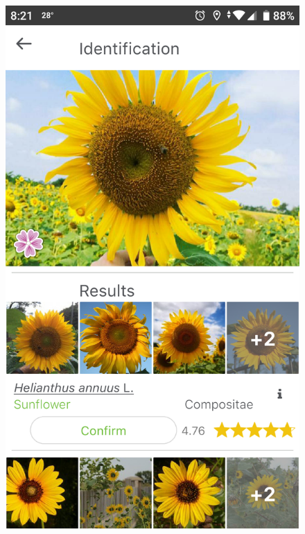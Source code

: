 \documentclass[12pt]{report}
\begin{document}
\begin{figure}[h]
			\includegraphics[scale=0.13]{app_en_2}

\end{figure}
\end{document}
